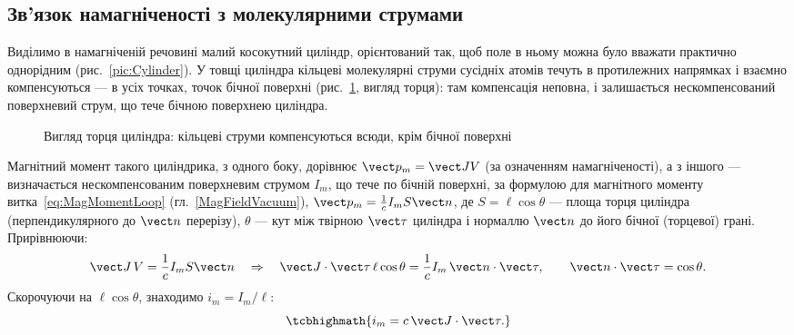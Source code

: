 \subsection*{Зв'язок намагніченості з молекулярними струмами}

Виділимо в намагніченій речовині малий косокутний циліндр, орієнтований так, щоб поле в ньому можна було вважати практично однорідним
(рис.~\ref{pic:Cylinder}). У товщі циліндра кільцеві молекулярні струми сусідніх атомів течуть в протилежних напрямках і взаємно компенсуються --- в
усіх точках,  точок бічної поверхні (рис.~\ref{pic:CylinderTop}, вигляд торця): там компенсація неповна, і залишається нескомпенсований
поверхневий струм, що тече бічною поверхнею циліндра.

\begin{figure}[h!]
	\centering
	\begin{minipage}[t]{0.48\linewidth}\centering
		\caption{Косокутний циліндр у намагніченій речовині}\label{pic:Cylinder}
	\end{minipage}\hfill
	\begin{minipage}[t]{0.48\linewidth}\centering
		\caption{Вигляд торця циліндра: кільцеві струми компенсуються всюди, крім бічної поверхні}\label{pic:CylinderTop}
	\end{minipage}
\end{figure}

Магнітний момент такого циліндрика, з одного боку, дорівнює $\vect p_m = \vect J V$ (за означенням намагніченості), а з іншого --- визначається
нескомпенсованим поверхневим струмом $I_m$, що тече по бічній поверхні, за формулою для магнітного моменту витка~\eqref{eq:MagMomentLoop} (гл.~\ref{MagFieldVacuum}), $\vect p_m
= \frac1c I_m S\vect n$, де $S = \ell\cos\theta$ --- площа торця циліндра (перпендикулярного до $\vect n$ перерізу), $\theta$ --- кут між твірною
$\vect\tau$ циліндра і нормаллю $\vect n$ до його бічної (торцевої) грані. Прирівнюючи:
\begin{equation*}
	\vect J\, V = \frac1c I_m S\vect n \quad\Rightarrow\quad \vect J\cdot\vect\tau\, \ell\cos\theta = \frac1c I_m\, \vect n\cdot\vect\tau,
	\qquad \vect n\cdot\vect\tau = \cos\theta.
\end{equation*}
Скорочуючи на $\ell\cos\theta$, знаходимо  $i_m = I_m/\ell$:
\begin{equation}\label{eq:MolecularSurfaceCurrent}
	\tcbhighmath{
		i_m = c\, \vect J\cdot\vect\tau.
	}
\end{equation}

